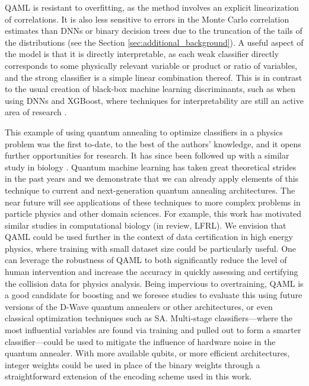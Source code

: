 QAML is resistant to overfitting, as the method involves an explicit linearization of correlations. It is also less sensitive to errors in the Monte Carlo correlation estimates than DNNs or binary decision trees due to the truncation of the tails of the distributions (see the Section \ref{sec:additional_background}).
A useful aspect of the model is that it is directly interpretable, as each weak classifier directly corresponds to some physically relevant variable or product or ratio of variables, and the strong classifier is a simple linear combination thereof. This is in contrast to the usual creation of black-box machine learning discriminants, such as when using DNNs and XGBoost, where techniques for interpretability are still an active area of research \cite{Chen:2016aa}.

This example of using quantum annealing to optimize classifiers in a physics problem was the first to-date, to the best of the authors' knowledge, and it opens further opportunities for research. It has since been followed up with a similar study in biology \cite{li2018quantum}. Quantum machine learning has taken great theoretical strides in the past years  \cite{Lloyd:2014fk,Wiebe:2014vn,Paparo:2014kx,Rebentrost:2014uq,Schuld:2014eu,Cong:2015zr,Biamonte:2016aa} and we demonstrate that we can already apply elements of this technique to current and next-generation quantum annealing architectures. The near future will see applications of these techniques to more complex problems in particle physics and other domain sciences. For example, this work has motivated similar studies in computational biology (in review, LFRL).%
We envision that QAML could be used further in the context of data certification in high energy physics,
where training with small dataset size could be particularly useful. One can leverage the robustness of QAML to
both significantly reduce the level of human intervention and increase the accuracy in quickly assessing and certifying the collision data
for physics analysis. Being impervious to overtraining, QAML is a good candidate for boosting\cite{xgboost}
and we foresee studies to evaluate this using future versions of the D-Wave quantum annealers or other architectures, or even classical optimization techniques such as SA.
Multi-stage classifiers---where the most influential variables are found via training and pulled out to form a smarter classifier---could be used to mitigate the influence of hardware noise in the quantum annealer.  With more available qubits, or more efficient architectures, integer weights could be used in place of the binary weights through a straightforward extension of the encoding scheme used in this work.


